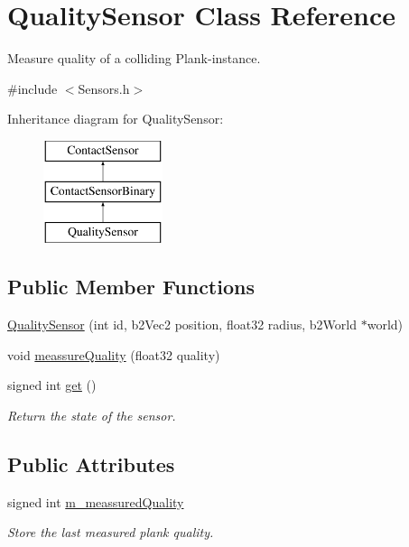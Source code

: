 \hypertarget{classQualitySensor}{\section{Quality\-Sensor Class Reference}
\label{classQualitySensor}
}


Measure quality of a colliding Plank-\/instance.  




{\ttfamily \#include $<$Sensors.\-h$>$}

Inheritance diagram for Quality\-Sensor\-:\begin{figure}[H]
\begin{center}
\leavevmode
\includegraphics[height=3.000000cm]{classQualitySensor}
\end{center}
\end{figure}
\subsection*{Public Member Functions}
\begin{DoxyCompactItemize}
\item 
\hyperlink{classQualitySensor_a4ef03471dc36c3645e818b18da8a735c}{Quality\-Sensor} (int id, b2\-Vec2 position, float32 radius, b2\-World $\ast$world)
\item 
void \hyperlink{classQualitySensor_a65cff94293bca6403c88f64a1986eb53}{meassure\-Quality} (float32 quality)
\item 
signed int \hyperlink{classQualitySensor_ab8740e275a34b860b0b370183eb4d578}{get} ()
\begin{DoxyCompactList}\small\item\em Return the state of the sensor. \end{DoxyCompactList}\end{DoxyCompactItemize}
\subsection*{Public Attributes}
\begin{DoxyCompactItemize}
\item 
signed int \hyperlink{classQualitySensor_ab8ff0417a223b169e73312f06c044cde}{m\-\_\-meassured\-Quality}
\begin{DoxyCompactList}\small\item\em Store the last measured plank quality. \end{DoxyCompactList}\end{DoxyCompactItemize}


